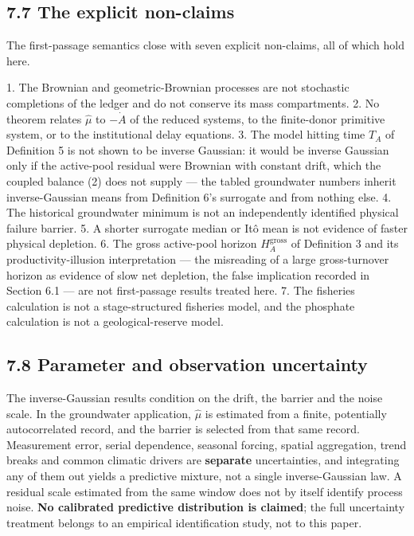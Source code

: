 \documentclass[11pt]{article}
\begin{document}
\subsection*{7.7 The explicit non-claims}\label{77-the-explicit-non-claims}

The first-passage semantics close with seven explicit non-claims, all of which hold here.

1. The Brownian and geometric-Brownian processes are not stochastic completions of the ledger and do not conserve its mass compartments. 2. No theorem relates \(\widehat\mu\) to \(-\dot A\) of the reduced systems, to the finite-donor primitive system, or to the institutional delay equations. 3. The model hitting time \(T_A\) of Definition 5 is not shown to be inverse Gaussian: it would be inverse Gaussian only if the active-pool residual were Brownian with constant drift, which the coupled balance (2) does not supply --- the tabled groundwater numbers inherit inverse-Gaussian means from Definition 6's surrogate and from nothing else. 4. The historical groundwater minimum is not an independently identified physical failure barrier. 5. A shorter surrogate median or It\^{o} mean is not evidence of faster physical depletion. 6. The gross active-pool horizon \(H_A^{\mathrm{gross}}\) of Definition 3 and its productivity-illusion interpretation --- the misreading of a large gross-turnover horizon as evidence of slow net depletion, the false implication recorded in Section 6.1 --- are not first-passage results treated here. 7. The fisheries calculation is not a stage-structured fisheries model, and the phosphate calculation is not a geological-reserve model.

\subsection*{7.8 Parameter and observation uncertainty}\label{78-parameter-and-observation-uncertainty}

The inverse-Gaussian results condition on the drift, the barrier and the noise scale. In the groundwater application, \(\hat\mu\) is estimated from a finite, potentially autocorrelated record, and the barrier is selected from that same record. Measurement error, serial dependence, seasonal forcing, spatial aggregation, trend breaks and common climatic drivers are \textbf{separate} uncertainties, and integrating any of them out yields a predictive mixture, not a single inverse-Gaussian law. A residual scale estimated from the same window does not by itself identify process noise. \textbf{No calibrated predictive distribution is claimed}; the full uncertainty treatment belongs to an empirical identification study, not to this paper.
\end{document}
